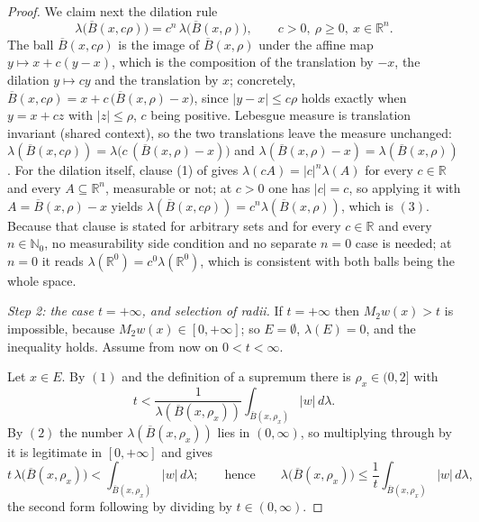 \begin{proof}
We claim next the dilation rule
\begin{equation*}
  \lambda\bigl(\overline B(x,c\rho)\bigr) = c^n\,\lambda\bigl(\overline
  B(x,\rho)\bigr), \qquad c > 0,\ \rho \geq 0,\ x \in \mathbb{R}^n . \tag{3}
\end{equation*}
The ball $\overline B(x,c\rho)$ is the image of $\overline B(x,\rho)$ under the
affine map $y \mapsto x + c(y-x)$, which is the composition of the translation
by $-x$, the dilation $y \mapsto cy$ and the translation by $x$; concretely,
$\overline B(x,c\rho) = x + c\,\bigl(\overline B(x,\rho) - x\bigr)$, since
$|y-x| \leq c\rho$ holds exactly when $y = x + c z$ with $|z| \leq \rho$,
$c$ being positive.  Lebesgue measure is translation invariant (shared
context), so the two translations leave the measure unchanged:
$\lambda(\overline B(x,c\rho))
   = \lambda\bigl(c\,(\overline B(x,\rho) - x)\bigr)$ and
$\lambda(\overline B(x,\rho) - x) = \lambda(\overline B(x,\rho))$.  For the
dilation itself, clause (1) of  gives
$\lambda(cA) = |c|^n\lambda(A)$ for every $c \in \mathbb{R}$ and every
$A \subseteq \mathbb{R}^n$, measurable or not; at $c > 0$ one has $|c| = c$, so
applying it with $A = \overline B(x,\rho) - x$ yields
$\lambda(\overline B(x,c\rho)) = c^n\lambda(\overline B(x,\rho))$, which is
$(3)$.  Because that clause is stated for arbitrary sets and for every
$c \in \mathbb{R}$ and every $n \in \mathbb{N}_0$, no measurability side
condition and no separate $n = 0$ case is needed; at $n = 0$ it reads
$\lambda(\mathbb{R}^0) = c^0\lambda(\mathbb{R}^0)$, which is consistent with
both balls being the whole space.

\emph{Step 2: the case $t = +\infty$, and selection of radii.}
If $t = +\infty$ then $M_2w(x) > t$ is impossible, because $M_2w(x) \in
[0,+\infty]$; so $E = \emptyset$, $\lambda(E) = 0$, and the inequality holds.
Assume from now on $0 < t < \infty$.

Let $x \in E$.  By $(1)$ and the definition of a supremum there is
$\rho_x \in (0,2]$ with
\[
  t < \frac{1}{\lambda(\overline B(x,\rho_x))}
      \int_{\overline B(x,\rho_x)}|w|\,d\lambda .
\]
By $(2)$ the number $\lambda(\overline B(x,\rho_x))$ lies in $(0,\infty)$, so
multiplying through by it is legitimate in $[0,+\infty]$ and gives
\begin{equation*}
  t\,\lambda\bigl(\overline B(x,\rho_x)\bigr)
    < \int_{\overline B(x,\rho_x)}|w|\,d\lambda ;
  \qquad\text{hence}\qquad
  \lambda\bigl(\overline B(x,\rho_x)\bigr)
    \leq \frac1t\int_{\overline B(x,\rho_x)}|w|\,d\lambda , \tag{4}
\end{equation*}
the second form following by dividing by $t \in (0,\infty)$.


\end{proof}
